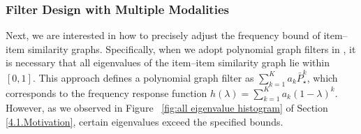 \documentclass[a4paper,fleqn]{cas-sc}
\renewcommand{\cite}{\citep}
\begin{document}


\subsubsection{Filter Design with Multiple Modalities}
Next, we are interested in how to precisely adjust the frequency bound of item--item similarity graphs. Specifically, when we adopt polynomial graph filters in \cite{DBLP:conf/sigir/ParkSS24, DBLP:conf/www/ParkYS25, DBLP:conf/www/KimCPS25}, it is necessary that all eigenvalues of the item--item similarity graph lie within $[0, 1]$. This approach defines a polynomial graph filter as $\sum_{k=1}^{K} a_k \bar P_\star^k$, which corresponds to the frequency response function $h(\lambda) = \sum_{k=1}^K a_k (1 - \lambda)^k$. However, as we observed in Figure ~\ref{fig:all eigenvalue histogram} of Section \ref{4.1.Motivation}, certain eigenvalues exceed the specified bounds.
\end{document}
